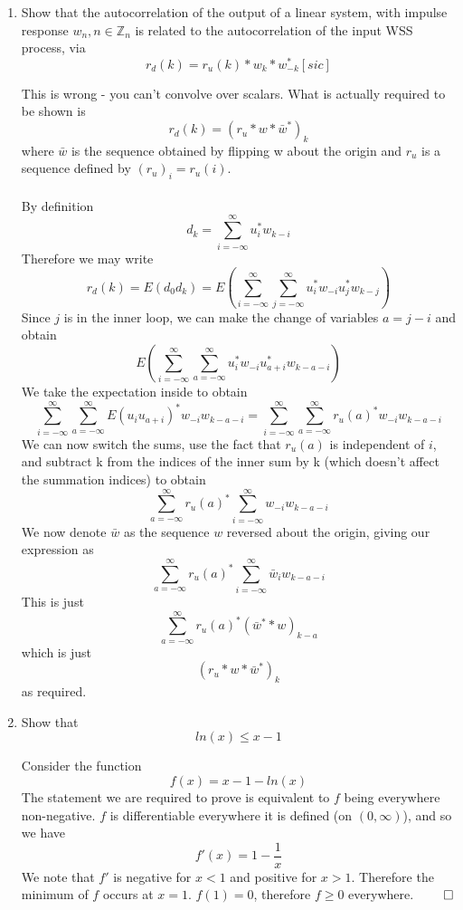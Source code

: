 \documentclass{article}
\newcommand{\chapternumber}{2}
\newenvironment{QandA}{\begin{enumerate}[label=\chapternumber.\arabic*]\bfseries\boldmath}
	{\end{enumerate}}
\newenvironment{answered}{\par\bigskip\normalfont\unboldmath}{}
\begin{document}
\begin{QandA}
	\item Show that the autocorrelation of the output of a linear system, with impulse response $w_n,n\in\mathbb{Z}_n$ is related to the autocorrelation of the input WSS process, via
	\[r_d(k)=r_u(k)* w_k* w^*_{-k}[sic]\]
	\begin{answered}
		This is wrong - you can't convolve over scalars. What is actually required to be shown is
		\[r_d(k)=(r_u* w* \bar{w}^*)_k\]
		where $\bar{w}$ is the sequence obtained by flipping w about the origin and $r_u$ is a sequence defined by $(r_u)_i=r_u(i)$.\\
		\\
		By definition
		\[d_k=\sum_{i=-\infty}^\infty u_i^*w_{k-i}\]
		Therefore we may write
		\[r_d(k)=E(d_0d_k)=E\left(\sum_{i=-\infty}^\infty\sum_{j=-\infty}^\infty u_i^*w_{-i}u_j^*w_{k-j}\right)\]
		Since $j$ is in the inner loop, we can make the change of variables $a=j-i$ and obtain
		\[E\left(\sum_{i=-\infty}^\infty\sum_{a=-\infty}^\infty u_i^*w_{-i}u_{a+i}^*w_{k-a-i}\right)\]
		We take the expectation inside to obtain
		\[\sum_{i=-\infty}^\infty\sum_{a=-\infty}^\infty E(u_iu_{a+i})^*w_{-i}w_{k-a-i}=\sum_{i=-\infty}^\infty\sum_{a=-\infty}^\infty r_u(a)^*w_{-i}w_{k-a-i}\]
		We can now switch the sums, use the fact that $r_u(a)$ is independent of $i$, and subtract k from the indices of the inner sum by k (which doesn't affect the summation indices) to obtain
		\[\sum_{a=-\infty}^\infty r_u(a)^*\sum_{i=-\infty}^\infty w_{-i}w_{k-a-i}\]
		We now denote $\bar{w}$ as the sequence $w$ reversed about the origin, giving our expression as
		\[\sum_{a=-\infty}^\infty r_u(a)^*\sum_{i=-\infty}^\infty \bar{w}_{i}w_{k-a-i}\]
		This is just 
		\[\sum_{a=-\infty}^\infty r_u(a)^*(\bar{w}^**w)_{k-a}\]
		which is just 
		\[(r_u* w* \bar{w}^*)_k\]
		as required.
	\end{answered}

	\item Show that 
	\[ln(x)\leq x-1\]
	\begin{answered}
		Consider the function \[f(x)=x-1-ln(x)\]The statement we are required to prove is equivalent to $f$ being everywhere non-negative. $f$ is differentiable everywhere it is defined (on $(0,\infty)$), and so we have
		\[f'(x)=1-\frac{1}{x}\]
		We note that $f'$ is negative for $x<1$ and positive for $x>1$. Therefore the minimum of $f$ occurs at $x=1$. $f(1)=0$, therefore $f\geq0$ everywhere. $\qed$		
	\end{answered}


\end{QandA}
\end{document}
